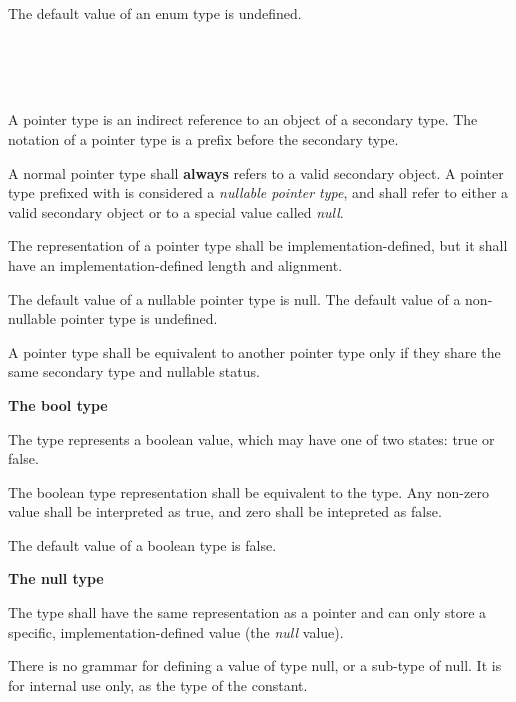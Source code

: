 \specsubsubitem
The default value of an enum type is undefined.


\begin{grammar}
 \\
	\terminal{*}  \\
	 \terminal{*}  \\
\end{grammar}

\specsubsubitem
A pointer type is an indirect reference to an object of a secondary type. The
notation of a pointer type is a \terminal{*} prefix before the secondary type.

\specsubsubitem
A normal pointer type shall \textbf{always} refers to a valid secondary object.
A pointer type prefixed with  is considered a
\textit{nullable pointer type}, and shall refer to either a valid secondary object
or to a special value called \textit{null}.

\specsubsubitem
The representation of a pointer type shall be implementation-defined, but it
shall have an implementation-defined length and alignment.

\specsubsubitem
The default value of a nullable pointer type is null. The default value of a
non-nullable pointer type is undefined.

\specsubsubitem
A pointer type shall be equivalent to another pointer type only if they share
the same secondary type and nullable status.


\textbf{The bool type}

\specsubsubitem
The  type represents a boolean value, which may have one of two
states: true or false.

\specsubsubitem
The boolean type representation shall be equivalent to the  type.
Any non-zero value shall be interpreted as true, and zero shall be intepreted as
false.

\specsubsubitem
The default value of a boolean type is false.

\textbf{The null type}

\specsubsubitem
The  type shall have the same representation as a pointer and can
only store a specific, implementation-defined value (the \textit{null} value).

\specsubsubitem
There is no grammar for defining a value of type null, or a sub-type of null. It
is for internal use only, as the type of the  constant.


